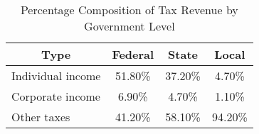 \clearpage
\begin{table}[htbp]
    \centering
    \caption{Percentage Composition of Tax Revenue by Government Level}
    \begin{tabular}{lccc}
        \toprule
        \multicolumn{1}{c}{Type} & Federal & State   & Local   \\
        \midrule
        Individual income        & 51.80\% & 37.20\% & 4.70\%  \\
        Corporate income         & 6.90\%  & 4.70\%  & 1.10\%  \\
        Other taxes              & 41.20\% & 58.10\% & 94.20\% \\
        \bottomrule
    \end{tabular}%
    \label{Table 1.2}%
\end{table}%

